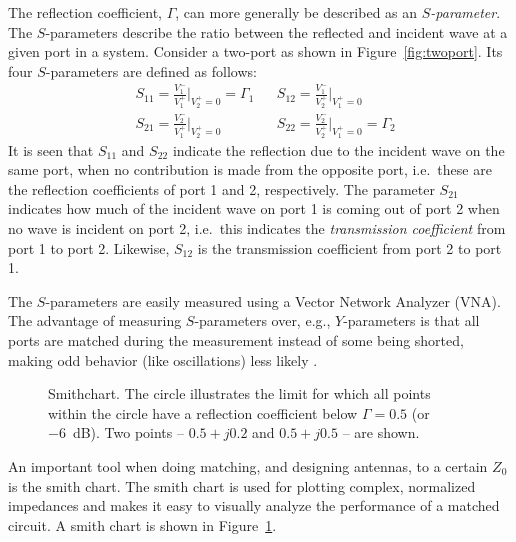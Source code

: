 The reflection coefficient, $\Gamma$, can more generally be described as an \emph{$S$-parameter}. The $S$-parameters describe the ratio between the reflected and incident wave at a given port in a system. Consider a two-port as shown in Figure~\ref{fig:twoport}. Its four $S$-parameters are defined as follows:
\begin{equation}
    \begin{aligned}
        &S_{11} = \frac{V_1^-}{V_1^+} \Bigg|_{V_2^+=0} = \Gamma_1
        &&S_{12} = \frac{V_1^-}{V_2^+} \Bigg|_{V_1^+=0} \\
        &S_{21} = \frac{V_2^-}{V_1^+} \Bigg|_{V_2^+=0}
        &&S_{22} = \frac{V_2^-}{V_2^+} \Bigg|_{V_1^+=0} = \Gamma_2
    \end{aligned}
\end{equation}
It is seen that $S_{11}$ and $S_{22}$ indicate the reflection due to the incident wave on the same port, when no contribution is made from the opposite port, i.e.\ these are the reflection coefficients of port 1 and 2, respectively. The parameter $S_{21}$ indicates how much of the incident wave on port 1 is coming out of port 2 when no wave is incident on port 2, i.e.\ this indicates the \emph{transmission coefficient} from port 1 to port 2. Likewise, $S_{12}$ is the transmission coefficient from port 2 to port 1.

The $S$-parameters are easily measured using a Vector Network Analyzer (VNA). The advantage of measuring $S$-parameters over, e.g., $Y$-parameters is that all ports are matched during the measurement instead of some being shorted, making odd behavior (like oscillations) less likely \cite{Bowick2007}.

\begin{figure}[htbp]
    \centering
    \caption{Smithchart. The circle illustrates the limit for which all points within the circle have a reflection coefficient below $\Gamma=0.5$ (or \SI{-6}{dB}). Two points -- $0.5+j0.2$ and $0.5+j0.5$ -- are shown.}
    \label{fig:smithchart}
\end{figure}
An important tool when doing matching, and designing antennas, to a certain $Z_0$ is the smith chart. The smith chart is used for plotting complex, normalized impedances and makes it easy to visually analyze the performance of a matched circuit. A smith chart is shown in Figure~\ref{fig:smithchart}.

